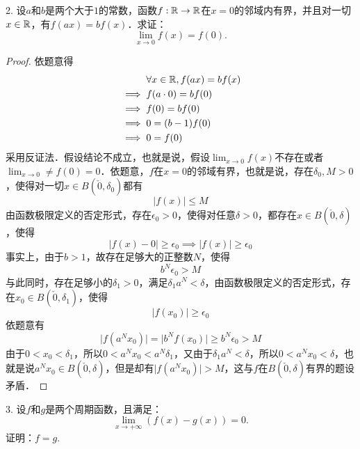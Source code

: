 2. 设$a$和$b$是两个大于$1$的常数，函数$f: \mathbb{R} \to \mathbb{R}$在$x=0$的邻域内有界，并且对一切$x \in \mathbb{R}$，有$f(ax) = bf(x)$．求证：
\begin{equation}
    \lim_{x \to 0} f(x) = f(0).
\end{equation}

\begin{proof}
依题意得
\begin{align}
    &\mathrel{\phantom{\implies}} \forall x \in \mathbb{R}, f(ax) = bf(x) \\
    &\implies f(a \cdot 0) = bf(0) \\
    &\implies f(0) = bf(0) \\
    &\implies 0 = (b-1)f(0) \\
    &\implies 0 = f(0)
\end{align}
采用反证法．假设结论不成立，也就是说，假设$\displaystyle\lim_{x \to 0} f(x)$不存在或者$\displaystyle\lim_{x \to 0} \neq f(0) = 0$．依题意，$f$在$x=0$的邻域有界，也就是说，存在$\delta_0, M > 0$，使得对一切$x \in B(\check{0}, \delta_0)$都有
\begin{equation}
    \lvert f(x) \rvert \leq M
\end{equation}
由函数极限定义的否定形式，存在$\epsilon_0 > 0$，使得对任意$\delta > 0$，都存在$x \in B(\check{0}, \delta)$，使得
\begin{equation}
    \lvert f(x) - 0 \rvert \geq \epsilon_0 \implies \lvert f(x) \rvert \geq \epsilon_0
\end{equation}
事实上，由于$b > 1$，故存在足够大的正整数$N$，使得
\begin{equation}
    b^N \epsilon_0 > M
\end{equation}
与此同时，存在足够小的$\delta_1 > 0$，满足$\delta_1 a^N < \delta$，由函数极限定义的否定形式，存在$x_0 \in B(\check{0},\delta_1)$，使得
\begin{equation}
    \lvert f(x_0) \rvert \geq \epsilon_0
\end{equation}
依题意有
\begin{equation}
    \lvert f(a^N x_0) \rvert = \lvert b^N f(x_0) \rvert \geq b^N \epsilon_0 > M
\end{equation}
由于$0 < x_0 < \delta_1$，所以$0 < a^N x_0 < a^N \delta_1$，又由于$\delta_1 a^N < \delta$，所以$0< a^N x_0 < \delta$，也就是说$a^N x_0 \in B(\check{0}, \delta)$，但是却有$\lvert f(a^N x_0) \rvert > M$，这与$f$在$B(\check{0}, \delta)$有界的题设矛盾．
\end{proof}

3. 设$f$和$g$是两个周期函数，且满足：
\begin{equation}
    \lim_{x \to +\infty} \left(f(x) - g(x)\right) = 0.
\end{equation}
证明：$f=g$.

